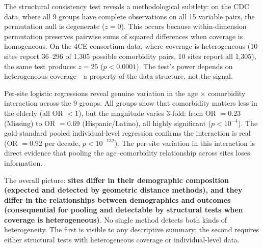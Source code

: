 \documentclass{article}
\begin{document}
The structural consistency test reveals a methodological subtlety: on the
CDC data, where all 9 groups have complete observations on all 15 variable
pairs, the permutation null is degenerate ($z = 0$).  This occurs because
within-dimension permutation preserves pairwise sums of squared differences
when coverage is homogeneous.  On the 4CE consortium data, where coverage
is heterogeneous (10 sites report 36--296 of 1,305 possible comorbidity
pairs, 10 sites report all 1,305), the same test produces $z = 25$ ($p <
0.0001$).  The test's power depends on heterogeneous coverage---a property
of the data structure, not the signal.

Per-site logistic regressions reveal genuine variation in the
age $\times$ comorbidity interaction across the 9 groups.  All groups show that
comorbidity matters less in the elderly (all OR $< 1$), but the magnitude
varies 3-fold: from OR $= 0.23$ (Missing) to OR $= 0.69$ (Hispanic/Latino),
all highly significant ($p < 10^{-4}$).  The gold-standard pooled
individual-level regression confirms the interaction is real (OR $= 0.92$ per
decade, $p < 10^{-132}$).  The per-site variation in this interaction is
direct evidence that pooling the age--comorbidity relationship across sites
loses information.

The overall picture: \textbf{sites differ in their demographic
composition (expected and detected by geometric distance methods), and they
differ in the relationships between demographics and outcomes (consequential
for pooling and detectable by structural tests when coverage is
heterogeneous)}.  No single method detects both kinds of heterogeneity.
The first is visible to any descriptive summary; the second requires either
structural tests with heterogeneous coverage or individual-level data.
\end{document}
